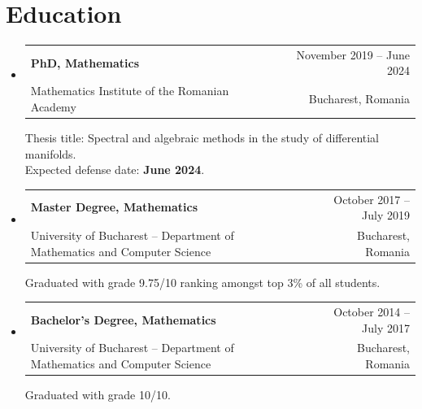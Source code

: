 \documentclass[a4paper, 11pt]{article}
\makeatletter
\newcommand{\CVSubheading}[4]{
  \vspace{-2pt}\item
    \begin{tabular*}{0.97\textwidth}[t]{l@{\extracolsep{\fill}}r}
      \textbf{#1} & #2 \\
      #3 & \ #4 \\
    \end{tabular*}\vspace{-7pt}
}
\newcommand{\CVSubHeadingListStart}{\begin{itemize}[leftmargin=0.5cm, label={}]}
\newcommand{\CVSubHeadingListEnd}{\end{itemize}}
\makeatother
\begin{document}
\section{Education}
  \CVSubHeadingListStart
    \CVSubheading
      {PhD, Mathematics}{November 2019 -- June 2024}
      {Mathematics Institute of the Romanian Academy}{Bucharest, Romania}

Thesis title: Spectral and algebraic methods in the study of differential manifolds.\\
Expected defense date: \textbf{June 2024}.
    \CVSubheading
      {Master Degree, Mathematics}{October 2017 -- July 2019}
      {University of Bucharest -- Department of Mathematics and Computer Science}{Bucharest, Romania}
      
Graduated with grade 9.75/10 ranking amongst top 3\% of all students.
    \CVSubheading
      {Bachelor's Degree, Mathematics}{October 2014 -- July 2017}
      {University of Bucharest -- Department of Mathematics and Computer Science}{Bucharest, Romania}
      
Graduated with grade 10/10.
  \CVSubHeadingListEnd

\end{document}
